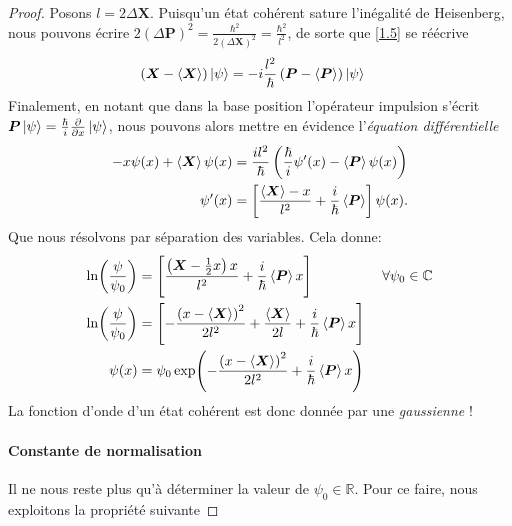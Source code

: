 \documentclass[11pt,oneside,a4paper]{article}
\newcommand{\h}{\ensuremath{\hbar}}
\begin{document}
\begin{proof}
Posons $l = 2\Delta \bm{X}$. Puisqu'un état cohérent sature l'inégalité de Heisenberg, nous pouvons écrire $2\left(\Delta\bm{P}\right)^2 = \frac{\h^2}{2\left(\Delta\bm{X}\right)^2} = \frac{\h^2}{l^2}$, de sorte que \eqref{1.5} se réécrive
\begin{align}
  \left(\bm{X}-\expval{\bm{X}}\right)\ket{\psi} &= -i\frac{l^2}{\h}\left(\bm{P}-\expval{\bm{P}}\right)\ket{\psi}\label{1.6}
\end{align}
Finalement, en notant que dans la base position l'opérateur impulsion s'écrit $\bm{P}\ket{\psi} = \frac{\h}{i}\frac{\partial}{\partial x}\ket{\psi}$, nous pouvons alors mettre en évidence l'\emph{équation différentielle}
\begin{align}
  -x\psi(x)+\expval{\bm{X}}\psi(x)&=\frac{il^2}{\h}\left(\frac{\h}{i}\psi'(x)-\expval{\bm{P}}\psi(x)\right)\notag\\
  \psi'(x) &= \left[\frac{\expval{\bm{X}}-x}{l^2}+\frac{i}{\h}\expval{\bm{P}}\right]\psi(x).\notag
\end{align}
Que nous résolvons par séparation des variables. Cela donne:
\begin{align}
  \ln(\frac{\psi}{\psi_0}) &= \left[\frac{\left(\bm{X}-\frac{1}{2}x\right)x}{l^2}+\frac{i}{\h}\expval{\bm{P}}x\right]   &\; \forall\psi_0\in\mathbb{C}\notag\\
  \ln(\frac{\psi}{\psi_0}) &= \left[-\frac{\left(x-\expval{\bm{X}}\right)^2}{2l^2}+\frac{\expval{\bm{X}}}{2l}+\frac{i}{\h}\expval{\bm{P}}x\right]\notag\\
  \psi(x) &= \psi_0\exp(-\frac{\left(x-\expval{\bm{X}}\right)^2}{2l^2}+\frac{i}{\h}\expval{\bm{P}}x)
\end{align}
La fonction d'onde d'un état cohérent est donc donnée par une \emph{gaussienne} !

\paragraph{Constante de normalisation}
Il ne nous reste plus qu'à déterminer la valeur de $\psi_0\in\mathbb{R}$. Pour ce faire, nous exploitons la propriété suivante


\end{proof}
\end{document}

